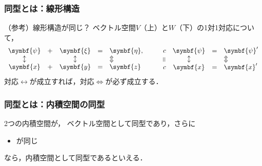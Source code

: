 \documentclass[
    10pt,
    ]{sotsu-beamer}
\begin{document}
\begin{frame}
    \frametitle{同型とは：線形構造}

    \begin{block}{（参考）線形構造が同じ？}
        ベクトル空間$V$（上）と$W$（下）の1対1対応について，
        \begin{align*}
            \begin{array}{ccccl}
                \symbf{\psi} &+ &\symbf{\xi} &= &\symbf{\eta},
                \\
                \updownarrow &  &\updownarrow &  &\Updownarrow 
                \\
                \symbf{x} &+ &\symbf{y} &= &\symbf{z}
            \end{array}
            \qquad 
            \begin{array}{cccl}
                c &\symbf{\psi} &= &\symbf{\psi}'
                \\
                \rotatebox[origin=c]{90}{$=$} &\updownarrow &  &\Updownarrow
                \\
                c &\symbf{x} &= &\symbf{x}'
            \end{array}
        \end{align*}
        対応$\leftrightarrow$が成立すれば，対応$\Leftrightarrow$が必ず成立する．
    \end{block}

\end{frame}



\begin{frame}
    \frametitle{同型とは：内積空間の同型}

    2つの内積空間が，
    ベクトル空間として同型であり，さらに
    \begin{itemize}
        \item {}が同じ
    \end{itemize}
    なら，内積空間として同型であるといえる．

\end{frame}
\end{document}
